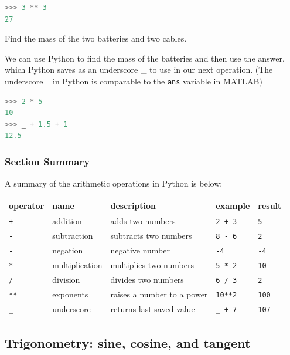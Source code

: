\documentclass{book}
\begin{document}
\begin{lstlisting}[language=Python]
>>> 3 ** 3
27
\end{lstlisting}

Find the mass of the two batteries and two cables.

We can use Python to find the mass of the batteries and then use the
answer, which Python saves as an underscore \_ to use in our next
operation. (The underscore \lstinline!_! in Python is comparable to the
\lstinline!ans! variable in MATLAB)

\begin{lstlisting}[language=Python]
>>> 2 * 5 
10
>>> _ + 1.5 + 1
12.5
\end{lstlisting}
    




    
        \subsubsection{Section Summary}\label{section-summary}

A summary of the arithmetic operations in Python is below:

\begin{longtable}[]{@{}lllll@{}}
\toprule
operator & name & description & example & result\tabularnewline
\midrule
\endhead
\lstinline!+! & addition & adds two numbers & \lstinline!2 + 3! &
\lstinline!5!\tabularnewline
\lstinline!-! & subtraction & subtracts two numbers & \lstinline!8 - 6!
& \lstinline!2!\tabularnewline
\lstinline!-! & negation & negative number & \lstinline!-4! &
\lstinline!-4!\tabularnewline
\lstinline!*! & multiplication & multiplies two numbers &
\lstinline!5 * 2! & \lstinline!10!\tabularnewline
\lstinline!/! & division & divides two numbers & \lstinline!6 / 3! &
\lstinline!2!\tabularnewline
\lstinline!**! & exponents & raises a number to a power &
\lstinline!10**2! & \lstinline!100!\tabularnewline
\lstinline!_! & underscore & returns last saved value &
\lstinline!_ + 7! & \lstinline!107!\tabularnewline
\bottomrule
\end{longtable}
    




    
        \subsection{Trigonometry: sine, cosine, and
tangent}\label{trigonometry-sine-cosine-and-tangent}
    
\end{document}

